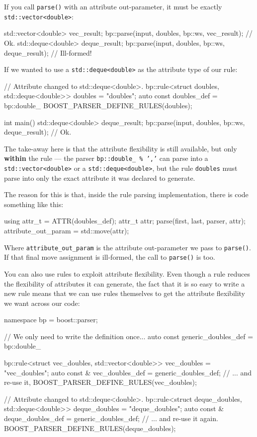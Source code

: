 If you call \texttt{parse()} with an attribute out-parameter, it must be exactly \texttt{std::vector<double>}:

\begin{code}
std::vector<double> vec_result;
bp::parse(input, doubles, bp::ws, vec_result); // Ok.
std::deque<double> deque_result;
bp::parse(input, doubles, bp::ws, deque_result); // Ill-formed!
\end{code}

If we wanted to use a \texttt{std::deque<double>} as the attribute type of our rule:

\begin{code}
// Attribute changed to std::deque<double>.
bp::rule<struct doubles, std::deque<double>> doubles = "doubles";
auto const doubles_def = bp::double_ %
BOOST_PARSER_DEFINE_RULES(doubles);

int main()
{
    std::deque<double> deque_result;
    bp::parse(input, doubles, bp::ws, deque_result); // Ok.
}
\end{code}

The take-away here is that the attribute flexibility is still available, but only \textbf{within} the rule --- the parser \texttt{bp::double\_ \% ','} can parse into a \texttt{std::vector<double>} or a \texttt{std::deque<double>}, but the rule \texttt{doubles} must parse into only the exact attribute it was declared to generate.

The reason for this is that, inside the rule parsing implementation, there is code something like this:

\begin{code}
using attr_t = ATTR(doubles_def);
attr_t attr;
parse(first, last, parser, attr);
attribute_out_param = std::move(attr);
\end{code}

Where \texttt{attribute\_out\_param} is the attribute out-parameter we pass to \texttt{parse()}. If that final move assignment is ill-formed, the call to \texttt{parse()} is too.

You can also use rules to exploit attribute flexibility. Even though a rule reduces the flexibility of attributes it can generate, the fact that it is so easy to write a new rule means that we can use rules themselves to get the attribute flexibility we want across our code:

\begin{code}
namespace bp = boost::parser;

// We only need to write the definition once...
auto const generic_doubles_def = bp::double_ %

bp::rule<struct vec_doubles, std::vector<double>> vec_doubles = "vec_doubles";
auto const & vec_doubles_def = generic_doubles_def; // ... and re-use it,
BOOST_PARSER_DEFINE_RULES(vec_doubles);

// Attribute changed to std::deque<double>.
bp::rule<struct deque_doubles, std::deque<double>> deque_doubles = "deque_doubles";
auto const & deque_doubles_def = generic_doubles_def; // ... and re-use it again.
BOOST_PARSER_DEFINE_RULES(deque_doubles);
\end{code}

